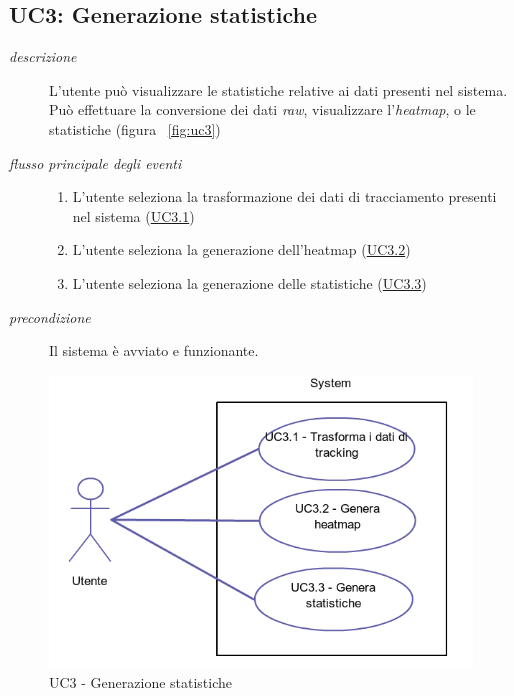 \subsection{UC3: Generazione statistiche} \label{sec:UC3}
\begin{description}
\item[\em{descrizione }]L'utente può visualizzare le statistiche relative ai dati presenti nel sistema. Può effettuare la conversione dei dati \textit{raw}, visualizzare l'\textit{heatmap}, o le statistiche (figura ~\ref{fig:uc3})
\item[\em{flusso principale degli eventi }] \mbox{}
\begin{enumerate}
\item L'utente seleziona la trasformazione dei dati di tracciamento presenti nel sistema (\hyperref[sec:uc3.1]{UC3.1})
\item L'utente seleziona la generazione dell'heatmap (\hyperref[sec:uc3.2]{UC3.2})
\item L'utente seleziona la generazione delle statistiche (\hyperref[sec:uc3.3]{UC3.3})
\end{enumerate}
\item[\em{precondizione }] Il sistema è avviato e funzionante.
\end{description}

\begin{figure}[htpb] 
\centering 
\includegraphics[scale=0.4]{./images/uc3.png} 
\caption{UC3 - Generazione statistiche} 
\label{fig:UC3}
\end{figure} 

